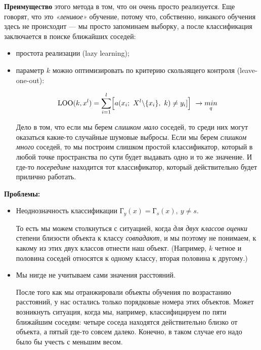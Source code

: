 \documentclass{article}
\begin{document}
\textbf{Преимущество} этого метода в том, что он очень просто реализуется. Еще говорят, что это \textit{«ленивое»} обучение, потому что, собственно, никакого обучения здесь не происходит --- мы просто запоминаем выборку, а после классификация заключается в поиске ближайших соседей:

\begin{itemize}
\item простота реализации (lazy learning);
\item параметр $k$ можно оптимизировать по критерию скользящего контроля (leave-one-out):

$$\text{LOO}(k, x^l)=\sum\limits_{i = 1}^l\Bigl[a(x_i;\ X^l\backslash\{x_i\},\ k) \not= y_i]\Bigr]\ 
\rightarrow \underset{q}{min}$$

Дело в том, что если мы берем \textit{слишком мало} соседей, то среди них могут оказаться какие-то случайные шумовые выбросы. Если мы берем \textit{слишком много} соседей, то мы построим слишком простой классификатор, который в любой точке пространства по сути будет выдавать одно и то же значение. И где-то \textit{посередине} находится тот классификатор, который действительно будет прилично работать.
\\
\end{itemize}

\textbf{Проблемы:}

\begin{itemize}
\item Неоднозначность классификации Г$_y(x) = $Г$_s(x),\ y\not=s$.

То есть мы можем столкнуться с ситуацией, когда \textit{для двух классов оценки} степени близости объекта к классу \textit{совпадают}, и мы поэтому не понимаем, к какому из этих двух классов отнести наш объект. (Например, $k$ четное и половина соседей относятся к одному классу, вторая половина к другому.)

\item Мы нигде не учитываем сами значения расстояний.

После того как мы отранжировали объекты обучения по возрастанию расстояний, у нас остались только порядковые номера этих объектов. Может возникнуть ситуация, когда мы, например, классифицируем по пяти ближайшим соседям: четыре соседа находятся действительно близко от объекта, а пятый где-то совсем далеко. Конечно, в таком случае его надо было бы учесть с меньшим весом.
\end{itemize}

\quad
\\
\end{document}
